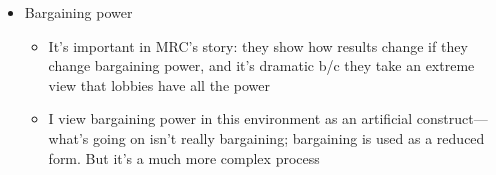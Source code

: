 \documentclass[12pt]{article}
\begin{document}
\begin{itemize}
\begin{itemize}
		\end{itemize}
	\item Bargaining power
		\begin{itemize}
			\item It's important in MRC's story: they show how results change if they change bargaining power, and it's dramatic b/c they take an extreme view that lobbies have all the power
			\item I view bargaining power in this environment as an artificial construct---what's going on isn't really bargaining; bargaining is used as a reduced form. But it's a much more complex process
		\end{itemize}
\end{itemize}

		
\end{document}
